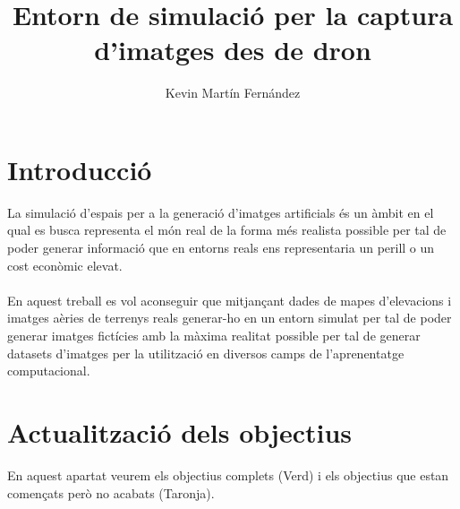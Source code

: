 \documentclass[10pt,a4paper,twocolumn,twoside]{article}
\author{\normalsize\sffamily Kevin Martín Fernández}
\title{\huge{\sffamily Entorn de simulació per la captura d'imatges des de dron}}
\date{}
\begin{document}
\fancyhead[RO]{\thepage}
\fancyhead[LE]{\thepage}

\fancyfoot[CO,CE]{}

{
   \fancyhf{}
}

\renewcommand{\headrulewidth}{0pt}
\renewcommand{\footrulewidth}{0pt}
\pagestyle{fancy}


\maketitle

\vspace{-1cm}
\section{Introducció}
La simulació d'espais per a la generació d'imatges artificials és un àmbit en el qual es busca representa el món real de la forma més realista possible per tal de poder generar informació que en entorns reals ens representaria un perill o un cost econòmic elevat.
\\
\\
En aquest treball es vol aconseguir que mitjançant dades de mapes d'elevacions i imatges aèries de terrenys reals generar-ho en un entorn simulat per tal de poder generar imatges fictícies amb la màxima realitat possible per tal de generar datasets d'imatges per la utilització en diversos camps de l'aprenentatge computacional.

\section{Actualització dels objectius}
En aquest apartat veurem els objectius complets (Verd) i els objectius que estan començats però no acabats (Taronja).
\end{document}
